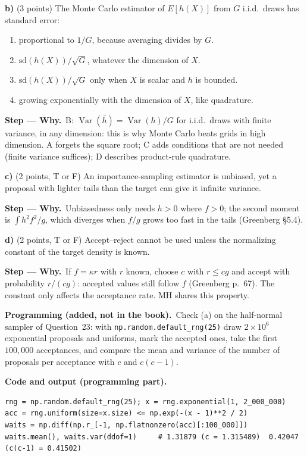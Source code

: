 \documentclass[11pt,a4paper]{article}
\newif\ifsolucoes
\numberwithin{equation}{questao}   %
\newcommand{\programacao}{\par\smallskip\noindent\textbf{Programming (added, not in the book).}~}
\newenvironment{alternativas}{\begin{enumerate}[label=\Alph*.,leftmargin=2.2em,topsep=1pt]}{\end{enumerate}}
\newcommand{\gabarito}[1]{\ifsolucoes\par\noindent\textbf{Key:}~#1\fi}
\newcommand{\passo}[2]{\par\smallskip\noindent\textbf{Step --- #1.}~#2}
\newcommand{\codehead}{\par\smallskip\noindent\textbf{Code and output (programming part).}\par}
\newcommand{\Var}{\operatorname{Var}}
\newcommand{\1}{\mathbf{1}}
\begin{document}
\textbf{b)} (3 points) The Monte Carlo estimator of $E[h(X)]$ from $G$ i.i.d.\ draws has standard error:
\begin{alternativas}
\item proportional to $1/G$, because averaging divides by $G$.
\item $\mathrm{sd}(h(X))/\sqrt G$, whatever the dimension of $X$.
\item $\mathrm{sd}(h(X))/\sqrt G$ only when $X$ is scalar and $h$ is bounded.
\item growing exponentially with the dimension of $X$, like quadrature.
\end{alternativas}
\gabarito{B}
\begin{sol}
\passo{Why}{B: $\Var(\bar h)=\Var(h)/G$ for i.i.d.\ draws with finite variance, in any dimension:
this is why Monte Carlo beats grids in high dimension. A forgets the square root; C adds
conditions that are not needed (finite variance suffices); D describes product-rule quadrature.}
\end{sol}

\textbf{c)} (2 points, T or F) An importance-sampling estimator is unbiased, yet a proposal with
lighter tails than the target can give it infinite variance.
\gabarito{T}
\begin{sol}
\passo{Why}{Unbiasedness only needs $h>0$ where $f>0$; the second moment is
$\int h^2f^2/g$, which diverges when $f/g$ grows too fast in the tails (Greenberg §5.4).}
\end{sol}

\textbf{d)} (2 points, T or F) Accept--reject cannot be used unless the normalizing constant of the
target density is known.
\gabarito{F}
\begin{sol}
\passo{Why}{If $f=\kappa r$ with $r$ known, choose $c$ with $r\le cg$ and accept with probability
$r/(cg)$: accepted values still follow $f$ (Greenberg p.~67). The constant only affects the
acceptance rate. MH shares this property.}
\end{sol}

\programacao Check (a) on the half-normal sampler of Question~23: with
\texttt{np.random.default\_rng(25)} draw $2\times10^6$ exponential proposals and uniforms, mark the
accepted ones, take the first $100{,}000$ acceptances, and compare the mean and variance of the
number of proposals per acceptance with $c$ and $c(c-1)$.
\begin{sol}
\codehead
{\small
\begin{verbatim}
rng = np.random.default_rng(25); x = rng.exponential(1, 2_000_000)
acc = rng.uniform(size=x.size) <= np.exp(-(x - 1)**2 / 2)
waits = np.diff(np.r_[-1, np.flatnonzero(acc)[:100_000]])
waits.mean(), waits.var(ddof=1)     # 1.31879 (c = 1.315489)  0.42047 (c(c-1) = 0.41502)
\end{verbatim}
}
\end{sol}
\end{document}
